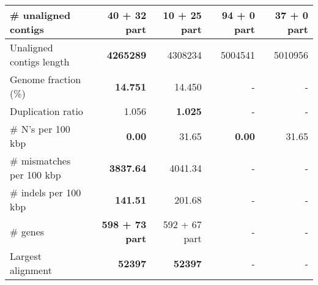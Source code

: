 \documentclass[12pt,a4paper]{article}
\begin{document}
\begin{table}[ht]
\begin{center}
\begin{tabular}{|l*{4}{|r}|}
\# unaligned contigs & 40 + 32 part & {\bf 10 + 25 part} & 94 + 0 part & 37 + 0 part \\ \hline
Unaligned contigs length & {\bf 4265289} & 4308234 & 5004541 & 5010956 \\ \hline
Genome fraction (\%) & {\bf 14.751} & 14.450 & - & - \\ \hline
Duplication ratio & 1.056 & {\bf 1.025} & - & - \\ \hline
\# N's per 100 kbp & {\bf 0.00} & 31.65 & {\bf 0.00} & 31.65 \\ \hline
\# mismatches per 100 kbp & {\bf 3837.64} & 4041.34 & - & - \\ \hline
\# indels per 100 kbp & {\bf 141.51} & 201.68 & - & - \\ \hline
\# genes & {\bf 598 + 73 part} & 592 + 67 part & - & - \\ \hline
Largest alignment & {\bf 52397} & {\bf 52397} & - & - \\ \hline
\end{tabular}
\end{center}
\end{table}
\end{document}
